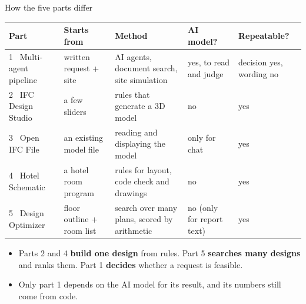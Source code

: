 \documentclass[9pt,aspectratio=169]{beamer}
\begin{document}
\begin{frame}{How the five parts differ}
\begingroup\small
\begin{tabular}{@{}p{2.9cm}p{2.9cm}p{3.3cm}p{1.6cm}p{1.6cm}@{}}
\toprule
\textbf{Part} & \textbf{Starts from} & \textbf{Method} & \textbf{AI model?} & \textbf{Repeatable?} \\ \midrule
1 \ Multi-agent pipeline & written request + site & AI agents, document search, site simulation & yes, to read and judge & decision yes, wording no \\
2 \ IFC Design Studio & a few sliders & rules that generate a 3D model & no & yes \\
3 \ Open IFC File & an existing model file & reading and displaying the model & only for chat & yes \\
4 \ Hotel Schematic & a hotel room program & rules for layout, code check and drawings & no & yes \\
5 \ Design Optimizer & floor outline + room list & search over many plans, scored by arithmetic & no (only for report text) & yes \\
\bottomrule
\end{tabular}\par\endgroup
\vspace{0.2cm}
\begin{itemize}
\item Parts 2 and 4 \textbf{build one design} from rules. Part 5 \textbf{searches many designs} and ranks them. Part 1 \textbf{decides} whether a request is feasible.
\item Only part 1 depends on the AI model for its result, and its numbers still come from code.
\end{itemize}
\end{frame}
\end{document}
